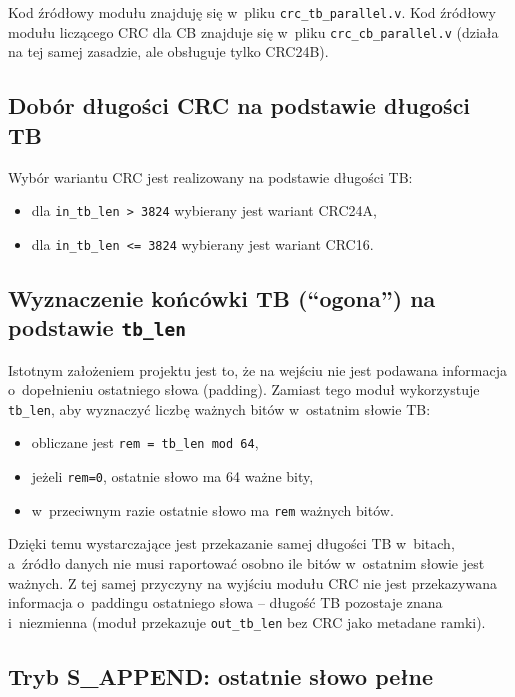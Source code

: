 Kod źródłowy modułu znajduję się w~pliku \texttt{crc\_tb\_parallel.v}. Kod źródłowy modułu liczącego CRC dla CB znajduje się w~pliku \texttt{crc\_cb\_parallel.v} (działa na tej samej zasadzie, ale obsługuje tylko CRC24B).

\subsection{Dobór długości CRC na podstawie długości TB}
\label{subsec:crc_len_select}

Wybór wariantu CRC jest realizowany na podstawie długości TB:
\begin{itemize}
    \item dla \texttt{in\_tb\_len > 3824} wybierany jest wariant CRC24A,
    \item dla \texttt{in\_tb\_len <= 3824} wybierany jest wariant CRC16.
\end{itemize}

\subsection{Wyznaczenie końcówki TB (``ogona'') na podstawie \texttt{tb\_len}}
\label{subsec:tail_calc}

Istotnym założeniem projektu jest to, że na wejściu nie jest podawana informacja o~dopełnieniu ostatniego słowa (padding). Zamiast tego moduł wykorzystuje \texttt{tb\_len}, aby wyznaczyć liczbę ważnych bitów w~ostatnim słowie TB:
\begin{itemize}
    \item obliczane jest \texttt{rem = tb\_len mod 64},
    \item jeżeli \texttt{rem=0}, ostatnie słowo ma 64 ważne bity,
    \item w~przeciwnym razie ostatnie słowo ma \texttt{rem} ważnych bitów.
\end{itemize}

Dzięki temu wystarczające jest przekazanie samej długości TB w~bitach, a~źródło danych nie musi raportować osobno ile bitów w~ostatnim słowie jest ważnych. Z tej samej przyczyny na wyjściu modułu CRC nie jest przekazywana informacja o~paddingu ostatniego słowa -- długość TB pozostaje znana i~niezmienna (moduł przekazuje \texttt{out\_tb\_len} bez CRC jako metadane ramki).

\subsection{Tryb S\_APPEND: ostatnie słowo pełne}
\label{subsec:append_mode}

